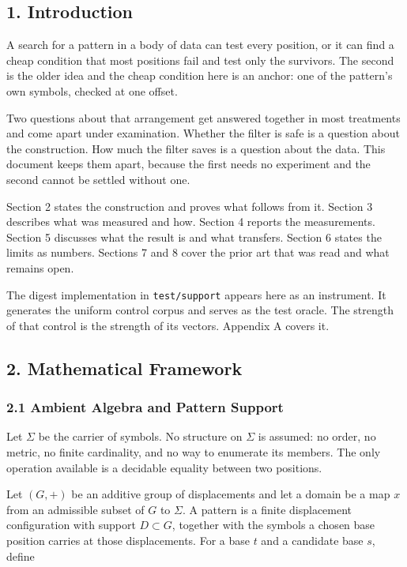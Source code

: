 \subsection{1. Introduction}

A search for a pattern in a body of data can test every position, or it can find a cheap condition that most positions fail and test only the survivors. The second is the older idea and the cheap condition here is an anchor: one of the pattern's own symbols, checked at one offset.

Two questions about that arrangement get answered together in most treatments and come apart under examination. Whether the filter is safe is a question about the construction. How much the filter saves is a question about the data. This document keeps them apart, because the first needs no experiment and the second cannot be settled without one.

Section 2 states the construction and proves what follows from it. Section 3 describes what was measured and how. Section 4 reports the measurements. Section 5 discusses what the result is and what transfers. Section 6 states the limits as numbers. Sections 7 and 8 cover the prior art that was read and what remains open.

The digest implementation in \texttt{test/\allowbreak{}support} appears here as an instrument. It generates the uniform control corpus and serves as the test oracle. The strength of that control is the strength of its vectors. Appendix A covers it.

\subsection{2. Mathematical Framework}

\subsubsection{2.1 Ambient Algebra and Pattern Support}

Let \(\Sigma\) be the carrier of symbols. No structure on \(\Sigma\) is assumed: no order, no metric, no finite cardinality, and no way to enumerate its members. The only operation available is a decidable equality between two positions.

Let \((G,+)\) be an additive group of displacements and let a domain be a map \(x\) from an admissible subset of \(G\) to \(\Sigma\). A pattern is a finite displacement configuration with support \(D \subset G\), together with the symbols a chosen base position carries at those displacements. For a base \(t\) and a candidate base \(s\), define

